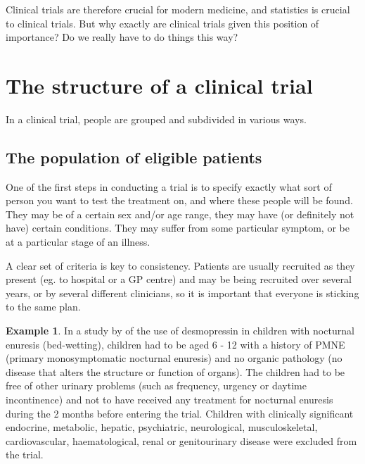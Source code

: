 \documentclass[
  openany]{book}
\theoremstyle{definition}
\theoremstyle{definition}
\newtheorem{example}{Example}[chapter]
\theoremstyle{definition}
\theoremstyle{definition}
\theoremstyle{remark}
\begin{document}
Clinical trials are therefore crucial for modern medicine, and statistics is crucial to clinical trials. But why exactly are clinical trials given this position of importance? Do we really have to do things this way?

\section{The structure of a clinical trial}\label{the-structure-of-a-clinical-trial}

In a clinical trial, people are grouped and subdivided in various ways.

\subsection*{The population of eligible patients}\label{the-population-of-eligible-patients}

One of the first steps in conducting a trial is to specify exactly what sort of person you want to test the treatment on, and where these people will be found. They may be of a certain sex and/or age range, they may have (or definitely not have) certain conditions. They may suffer from some particular symptom, or be at a particular stage of an illness.

A clear set of criteria is key to consistency. Patients are usually recruited as they present (eg. to hospital or a GP centre) and may be being recruited over several years, or by several different clinicians, so it is important that everyone is sticking to the same plan.

\begin{example}
In a study by \citet{hjalmas1998enuresis} of the use of desmopressin in children with nocturnal enuresis (bed-wetting), children had to be aged 6 - 12 with a history of PMNE (primary monosymptomatic nocturnal enuresis) and no organic pathology (no disease that alters the structure or function of organs). The children had to be free of other urinary problems (such as frequency, urgency or daytime incontinence) and not to have received any treatment for nocturnal enuresis during the 2 months before entering the trial. Children with clinically significant endocrine,
metabolic, hepatic, psychiatric, neurological, musculoskeletal, cardiovascular, haematological, renal or genitourinary disease were excluded from the trial.
\end{example}
\end{document}
